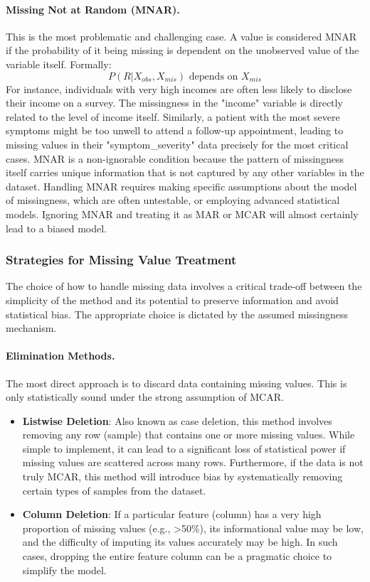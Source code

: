 \paragraph{Missing Not at Random (MNAR).} This is the most problematic and challenging case. A value is considered MNAR if the probability of it being missing is dependent on the unobserved value of the variable itself. Formally:
$$ P(R | X_{obs}, X_{mis}) \text{ depends on } X_{mis} $$
For instance, individuals with very high incomes are often less likely to disclose their income on a survey. The missingness in the "income" variable is directly related to the level of income itself. Similarly, a patient with the most severe symptoms might be too unwell to attend a follow-up appointment, leading to missing values in their "symptom\_severity" data precisely for the most critical cases. MNAR is a non-ignorable condition because the pattern of missingness itself carries unique information that is not captured by any other variables in the dataset. Handling MNAR requires making specific assumptions about the model of missingness, which are often untestable, or employing advanced statistical models. Ignoring MNAR and treating it as MAR or MCAR will almost certainly lead to a biased model.

\subsubsection{Strategies for Missing Value Treatment}
The choice of how to handle missing data involves a critical trade-off between the simplicity of the method and its potential to preserve information and avoid statistical bias. The appropriate choice is dictated by the assumed missingness mechanism.

\paragraph{Elimination Methods.} The most direct approach is to discard data containing missing values. This is only statistically sound under the strong assumption of MCAR.

\begin{itemize}
    \item \textbf{Listwise Deletion}: Also known as case deletion, this method involves removing any row (sample) that contains one or more missing values. While simple to implement, it can lead to a significant loss of statistical power if missing values are scattered across many rows. Furthermore, if the data is not truly MCAR, this method will introduce bias by systematically removing certain types of samples from the dataset.
    \item \textbf{Column Deletion}: If a particular feature (column) has a very high proportion of missing values (e.g., >50\%), its informational value may be low, and the difficulty of imputing its values accurately may be high. In such cases, dropping the entire feature column can be a pragmatic choice to simplify the model.
\end{itemize}

